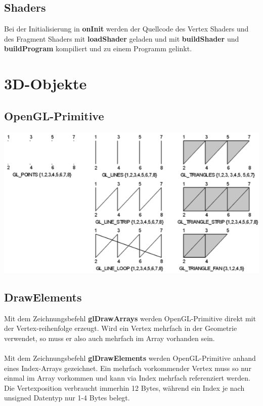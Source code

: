 \documentclass[10pt]{article}
\begin{document}
\subsection{Shaders}
Bei der Initialisierung in \textbf{onInit} werden der Quellcode des Vertex Shaders und des Fragment Shaders mit \textbf{loadShader} geladen und mit \textbf{buildShader} und \textbf{buildProgram} kompiliert und zu einem Programm gelinkt.



\newpage
\section{3D-Objekte}
\subsection{OpenGL-Primitive}
\begin{center}
	\includegraphics[scale=0.4]{opengl_primitive.png}
\end{center}
\subsection{DrawElements}
Mit dem Zeichnungsbefehl \textbf{glDrawArrays} werden OpenGL-Primitive direkt mit der Vertex-reihenfolge erzeugt. Wird ein Vertex mehrfach in der Geometrie verwendet, so muss er also auch mehrfach im Array vorhanden sein. \\
\\
Mit dem Zeichnungsbefehl \textbf{glDrawElements} werden OpenGL-Primitive anhand eines Index-Arrays gezeichnet. Ein mehrfach vorkommender Vertex muss so nur einmal im Array vorkommen und kann via Index mehrfach referenziert werden. Die Vertexposition verbraucht immerhin 12 Bytes, während ein Index je nach unsigned Datentyp nur 1-4 Bytes belegt.

\end{document}
